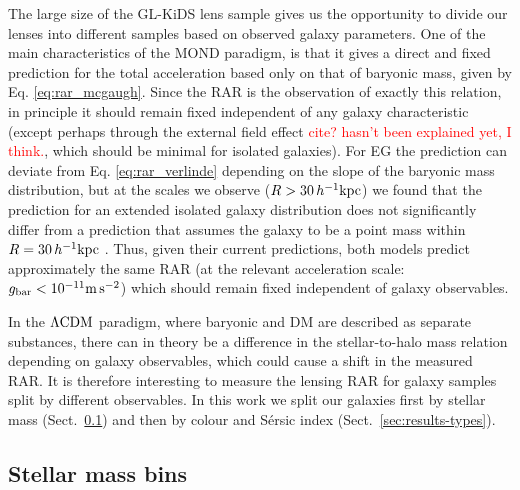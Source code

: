 \documentclass[usenatbib]{mnras}
\newcommand{\hkpc}{\, h^{-1}{\rm{kpc}} }
\newcommand{\mpss}{ {\rm m}\,{\rm s}^{-2} }
\newcommand{\lcdm}{{\rm \Lambda CDM}}
\newcommand{\un}[1]{_{\rm #1}}
\begin{document}
The large size of the GL-KiDS lens sample gives us the opportunity to divide our lenses into different samples based on observed galaxy parameters. One of the main characteristics of the MOND paradigm, is that it gives a direct and fixed prediction for the total acceleration based only on that of baryonic mass, given by Eq. \ref{eq:rar_mcgaugh}. Since the RAR is the observation of exactly this relation, in principle it should remain fixed independent of any galaxy characteristic (except perhaps through the external field effect \textcolor{red}{cite? hasn't been explained yet, I think.}, which should be minimal for isolated galaxies). For EG the prediction can deviate from Eq. \ref{eq:rar_verlinde} depending on the slope of the baryonic mass distribution, but at the scales we observe ($R>30\hkpc$) we found that the prediction for an extended isolated galaxy distribution does not significantly differ from a prediction that assumes the galaxy to be a point mass within $R=30\hkpc$ \cite[see Sect.~4.3 of][]{brouwer2017}. Thus, given their current predictions, both models predict approximately the same RAR (at the relevant acceleration scale: $g\un{bar}<10^{-11} \mpss$) which should remain fixed independent of galaxy observables.

In the $\lcdm$ paradigm, where baryonic and DM are described as separate substances, there can in theory be a difference in the stellar-to-halo mass relation depending on galaxy observables, which could cause a shift in the measured RAR. It is therefore interesting to measure the lensing RAR for galaxy samples split by different observables. In this work we split our galaxies first by stellar mass (Sect.~\ref{sec:results_Mstarbins}) and then by colour and S\'ersic index (Sect.~\ref{sec:results-types}).

\subsection{Stellar mass bins}
\label{sec:results_Mstarbins}
\end{document}
